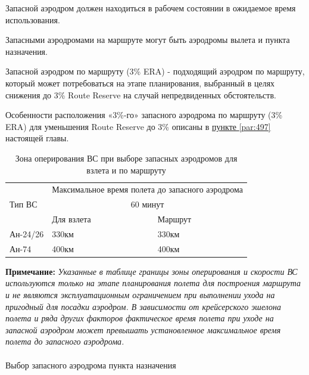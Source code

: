 Запасной аэродром должен находиться в рабочем состоянии в ожидаемое время использования.

Запасными аэродромами на маршруте могут быть аэродромы вылета и пункта назначения.

Запасной аэродром по маршруту (3\% ERA) - подходящий аэродром по маршруту, который может потребоваться на этапе планирования, выбранный в целях снижения до 3\% Route Reserve на случай непредвиденных обстоятельств.

Особенности расположения «3\%-го» запасного аэродрома по маршруту (3\% ERA) для уменьшения Route Reserve до 3\% описаны в \hyperref[par:497]{пункте \ref*{par:497}} настоящей главы.


\begin{table}[H]
    \begin{center}
    \caption{Зона оперирования ВС при выборе запасных аэродромов для взлета и по маршруту} \label{tbl:altto}
    \begin{tabular}{|p{}|p{}|p{}|}
    \hline
    &\multicolumn{2}{c|}{Максимальное время полета до запасного аэродрома}\\
    \cline{2-3}
    Тип ВС&\multicolumn{2}{c|}{60 минут}\\
    \cline{2-3}
    &Для взлета&Маршрут\\
    \hline
    Ан-24/26	&330км	&330км\\
    \hline
    Ан-74	    &400км	&400км\\
    \hline\hline


    \end{tabular}
    \end{center}
\end{table}

\textbf{Примечание:} \textit{Указанные в таблице границы зоны оперирования и скорости ВС используются только на этапе планирования полета для построения маршрута и не являются эксплуатационным ограничением при выполнении ухода на пригодный для посадки аэродром. В зависимости от крейсерского эшелона полета и ряда других факторов фактическое время полета при уходе на запасной аэродром может превышать установленное максимальное время полета до запасного аэродрома.}

\paragraph{}{Выбор запасного аэродрома пункта назначения}\label{sect:alt}


